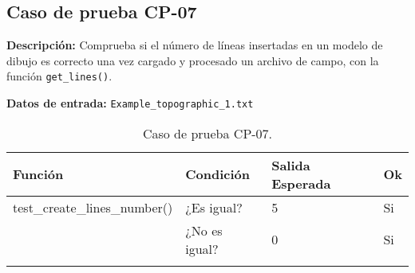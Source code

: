 \subsection{Caso de prueba CP-07}

\textbf{Descripción:} Comprueba si el número de líneas insertadas en un modelo de dibujo es correcto una vez cargado y procesado un archivo de campo, con la función \texttt{get\_lines()}.

\textbf{Datos de entrada:} \texttt{Example\_topographic\_1.txt}


\begin{longtable}[]{@{}llll@{}}
\toprule
\begin{minipage}[b]{0.6\columnwidth}\raggedright\strut
Función\strut
\end{minipage} & \begin{minipage}[b]{0.20\columnwidth}\raggedright\strut
Condición\strut
\end{minipage} & \begin{minipage}[b]{0.15\columnwidth}\raggedright\strut
Salida Esperada\strut
\end{minipage} & \begin{minipage}[b]{0.05\columnwidth}\raggedright\strut
Ok\strut
\end{minipage}\tabularnewline
\midrule
\endhead
\begin{minipage}[t]{0.6\columnwidth}\raggedright\strut
test\_create\_lines\_number()\strut
\end{minipage} & \begin{minipage}[t]{0.20\columnwidth}\raggedright\strut
¿Es igual?\strut
\end{minipage} & \begin{minipage}[t]{0.15\columnwidth}\raggedright\strut
5\strut
\end{minipage} & \begin{minipage}[t]{0.05\columnwidth}\raggedright\strut
Si\strut
\end{minipage}\tabularnewline
\begin{minipage}[t]{0.6\columnwidth}\raggedright\strut
\strut
\end{minipage} & \begin{minipage}[t]{0.20\columnwidth}\raggedright\strut
¿No es igual?\strut
\end{minipage} & \begin{minipage}[t]{0.15\columnwidth}\raggedright\strut
0\strut
\end{minipage} & \begin{minipage}[t]{0.05\columnwidth}\raggedright\strut
Si\strut
\end{minipage}\tabularnewline

\bottomrule
\caption{Caso de prueba CP-07.}
\end{longtable}

